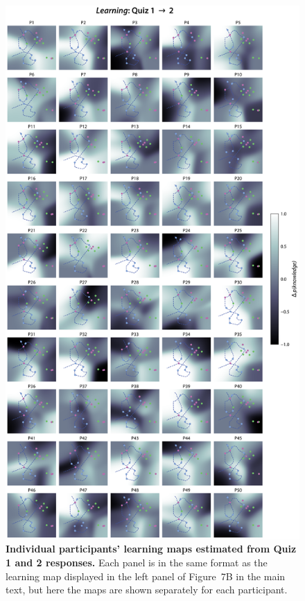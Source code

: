 \documentclass[10pt]{article}
\newcommand{\knowledgeMaps}{7}
\begin{document}
\begin{figure}[tp]
    \centering
    \includegraphics[height=0.9\textheight]{figs/individual-learnings-maps-quiz1-2}
    
    \caption{\textbf{Individual participants' learning maps estimated from
    Quiz 1 and 2 responses.} Each panel is in the same format as the learning map
    displayed in the left panel of Figure~\knowledgeMaps B in the main text,
    but here the maps are shown separately for each participant.}
    
    \label{fig:learning-maps-q1_2}
\end{figure}
\end{document}
